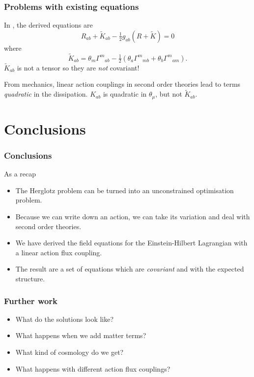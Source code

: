 \documentclass[xcolor=dvipsnames]{beamer}
\begin{document}
\begin{frame}
	\frametitle{Problems with existing equations}
	In \cite{Lazo2017}, the derived equations are
	\begin{equation*}
		R_{ab} + \tilde{K}_{ab} - \tfrac{1}{2}g_{ab}(R + \tilde{K}) = 0
	\end{equation*}
	where
	\begin{equation*}
		\tilde{K}_{ab} = \theta_m {\Gamma^m}_{ab} - \tfrac{1}{2}\left(\theta_a {\Gamma^m}_{mb} +
		\theta_b {\Gamma^m}_{am}\right). 
	\end{equation*}
	\pause \( \tilde{K}_{ab} \) is not a tensor so they are \emph{not} covariant!

	\pause From mechanics, linear action couplings in second order theories lead to terms
	\emph{quadratic} in the dissipation. \( K_{ab} \) is quadratic in	\( \theta_\mu \), but
	not \( \tilde{K}_{ab} \). 
\end{frame}

\section{Conclusions}
\begin{frame}
	\frametitle{Conclusions}
	As a recap \pause
	\begin{itemize}
		\item The Herglotz problem can be turned into an unconstrained optimisation problem.
			\pause
		\item Because we can write down an action, we can take its variation and deal with
			second order theories. \pause
		\item We have derived the field equations for the Einstein-Hilbert Lagrangian with a
			linear action flux coupling. \pause 
		\item The result are a set of equations which are \emph{covariant} and with the
			expected structure. \pause
	\end{itemize}
\end{frame}

\begin{frame}
	\frametitle{Further work}
	\pause
	\begin{itemize}
		\item What do the solutions look like? \pause
		\item What happens when we add matter terms? \pause
		\item What kind of cosmology do we get? \pause
		\item What happens with different action flux couplings? \pause
	\end{itemize}
\end{frame}
\end{document}
